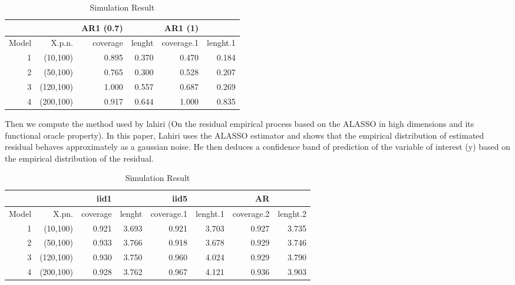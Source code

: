 \documentclass[11pt,oneside, a4paper]{amsart}\usepackage[]{graphicx}\usepackage[]{color}
\begin{document}
\begin{table}[ht]
\centering
\caption{Simulation Result} 
\label{Test_table}
{\footnotesize
\begin{tabular}{|r|r|rr|rr|}
  \toprule 
    &  & AR1 (0.7) &  & AR1 (1) &  \\
 \midrule 
Model & X.p.n. & coverage & lenght & coverage.1 & lenght.1 \\ 
    1 & (10,100) & 0.895 & 0.370 & 0.470 & 0.184 \\ 
     2 & (50,100) & 0.765 & 0.300 & 0.528 & 0.207 \\ 
     3 & (120,100) & 1.000 & 0.557 & 0.687 & 0.269 \\ 
     4 & (200,100) & 0.917 & 0.644 & 1.000 & 0.835 \\ 
   \bottomrule 
\end{tabular}
}
\end{table}








Then we compute the method used by lahiri (On the residual empirical process based on the ALASSO in high dimensions and its functional oracle property). In this paper, Lahiri uses the ALASSO estimator and shows that the empirical distribution of estimated residual behaves approximately as a gaussian noise. He then deduces a confidence band of prediction of the variable of interest (y) based on the empirical distribution of the residual.




\begin{table}[ht]
\centering
\caption{Simulation Result} 
\label{Test_table}
{\footnotesize
\begin{tabular}{|r|r|rr|rr|rr|}
  \toprule 
    &  & iid1 &  & iid5 & & AR & \\
 \midrule 
Model & X.pn. & coverage & lenght & coverage.1 & lenght.1 & coverage.2 & lenght.2 \\ 
    1 & (10,100) & 0.921 & 3.693 & 0.921 & 3.703 & 0.927 & 3.735 \\ 
     2 & (50,100) & 0.933 & 3.766 & 0.918 & 3.678 & 0.929 & 3.746 \\ 
     3 & (120,100) & 0.930 & 3.750 & 0.960 & 4.024 & 0.929 & 3.790 \\ 
     4 & (200,100) & 0.928 & 3.762 & 0.967 & 4.121 & 0.936 & 3.903 \\ 
   \bottomrule 
\end{tabular}
}
\end{table}
\end{document}

